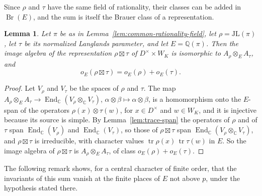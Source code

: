 \documentclass[a4paper,11pt]{amsart}
\newtheorem{lemma}[theorem]{Lemma}
\theoremstyle{definition}
\theoremstyle{remark}
\numberwithin{equation}{section}
\newcommand{\Q}{\mathbb{Q}}
\DeclareMathOperator{\Br}{Br}
\DeclareMathOperator{\End}{End}
\DeclareMathOperator{\tr}{tr}
\newcommand{\C}{\mathbb{C}}
\newcommand{\JL}{\mathrm{JL}}
\begin{document}
Since $\rho$ and $\tau$ have the same field of rationality, their classes can be added in $\Br(E)$, and the sum is itself the Brauer class of a representation.

\begin{lemma}\label{lem:sum-class}
Let $\pi$ be as in Lemma~\ref{lem:common-rationality-field}, let $\rho=\JL(\pi)$, let $\tau$ be its normalized Langlands parameter, and let $E=\Q(\pi)$. Then the image algebra of the representation $\rho\boxtimes\tau$ of $D^\times\times W_K$ is isomorphic to $A_\rho\otimes_EA_\tau$, and
\[
 o_E(\rho\boxtimes\tau)=o_E(\rho)+o_E(\tau).
\]
\end{lemma}

\begin{proof}
Let $V_\rho$ and $V_\tau$ be the spaces of $\rho$ and $\tau$. The map $A_\rho\otimes_EA_\tau\to\End_\C(V_\rho\otimes_\C V_\tau)$, $\alpha\otimes\beta\mapsto\alpha\otimes\beta$, is a homomorphism onto the $E$-span of the operators $\rho(x)\otimes\tau(w)$, for $x\in D^\times$ and $w\in W_K$, and it is injective because its source is simple. By Lemma~\ref{lem:trace-span} the operators of $\rho$ and of $\tau$ span $\End_\C(V_\rho)$ and $\End_\C(V_\tau)$, so those of $\rho\boxtimes\tau$ span $\End_\C(V_\rho\otimes_\C V_\tau)$, and $\rho\boxtimes\tau$ is irreducible, with character values $\tr\rho(x)\,\tr\tau(w)$ in $E$. So the image algebra of $\rho\boxtimes\tau$ is $A_\rho\otimes_EA_\tau$, of class $o_E(\rho)+o_E(\tau)$.
\end{proof}

The following remark shows, for a central character of finite order, that the invariants of this sum vanish at the finite places of $E$ not above $p$, under the hypothesis stated there.
\end{document}
